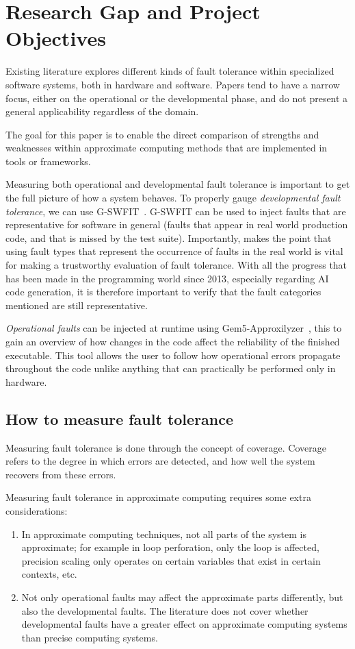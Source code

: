 \section{Research Gap and Project Objectives}

Existing literature explores different kinds of fault tolerance within specialized software systems, both in hardware and software. Papers tend to have a narrow focus, either on the operational or the developmental phase, and do not present a general applicability regardless of the domain.

The goal for this paper is to enable the direct comparison of strengths and weaknesses within approximate computing methods that are implemented in tools or frameworks. 


Measuring both operational and developmental fault tolerance is important to get the full picture of how a system behaves.
To properly gauge {\em developmental fault tolerance}, we can use G-SWFIT~\citep{duraes2006emulation}. G-SWFIT can be used to inject faults that are representative for software in general (faults that appear in real world production code, and that is missed by the test suite). Importantly, \citet{natella2012fault} makes the point that using fault types that represent the occurrence of faults in the real world is vital for making a trustworthy evaluation of fault tolerance. With all the progress that has been made in the programming world since 2013, especially regarding AI code generation, it is therefore important to verify that the fault categories mentioned are still representative.

{\em Operational faults} can be injected at runtime using Gem5-Approxilyzer~\citep{venkatagiri2019gem5}, this to gain an overview of how changes in the code affect the reliability of the finished executable. This tool allows the user to follow how operational errors propagate throughout the code unlike anything that can practically be performed only in hardware.



\subsection{How to measure fault tolerance}
Measuring fault tolerance is done through the concept of coverage. Coverage refers to the degree in which errors are detected, and how well the system recovers from these errors.

Measuring fault tolerance in approximate computing requires some extra considerations:
\begin{enumerate}
    \item  In approximate computing techniques, not all parts of the system is approximate; for example in loop perforation, only the loop is affected, precision scaling only operates on certain variables that exist in certain contexts, etc.
    \item Not only operational faults may affect the approximate parts differently, but also the developmental faults. The literature does not cover whether developmental faults have a greater effect on approximate computing systems than precise computing systems. 
\end{enumerate}


